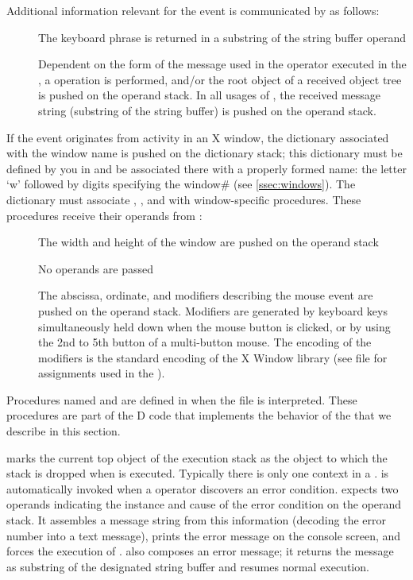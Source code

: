 Additional information relevant for the event is communicated by
 as follows:

\begin{description}
\item[] The keyboard phrase is returned in a
  substring of the string buffer operand
\item[] Dependent on the form of the message used in the
   operator executed in the , a 
  operation is performed, and/or the root object of a received object
  tree is pushed on the operand stack. In all usages of ,
  the received message string (substring of the string buffer) is
  pushed on the operand stack.
\end{description}

\noindent If the event originates from activity in an X window, the
dictionary associated with the window name is pushed on the dictionary
stack; this dictionary must be defined by you in  and be
associated there with a properly formed name: the letter `w' followed
by digits specifying the window\# (see \ref{ssec:windows}). The
dictionary must associate , , and
 with window-specific procedures. These procedures
receive their operands from :

\begin{description}
\item[] The width and height of the window are pushed
  on the operand stack
\item[] No operands are passed
\item[] The abscissa, ordinate, and modifiers
  describing the mouse event are pushed on the operand
  stack. Modifiers are generated by keyboard keys simultaneously held
  down when the mouse button is clicked, or by using the 2nd to 5th
  button of a multi-button mouse. The encoding of the modifiers is the
  standard encoding of the X Window library (see file
   for assignments used in the ).
\end{description}

Procedures named  and  are defined
in  when the file  is
interpreted. These procedures are part of the D code that implements
the behavior of the  that we describe in this section.

 marks the current top object of the execution stack as
the object to which the stack is dropped when  is
executed. Typically there is only one  context in a
.  is automatically invoked when a 
operator discovers an error condition.  expects two operands
indicating the instance and cause of the error condition on the
operand stack. It assembles a message string from this information
(decoding the error number into a text message), prints the error
message on the console screen, and forces the execution of
.  also composes an error message; it
returns the message as substring of the designated string buffer and
resumes normal execution.

